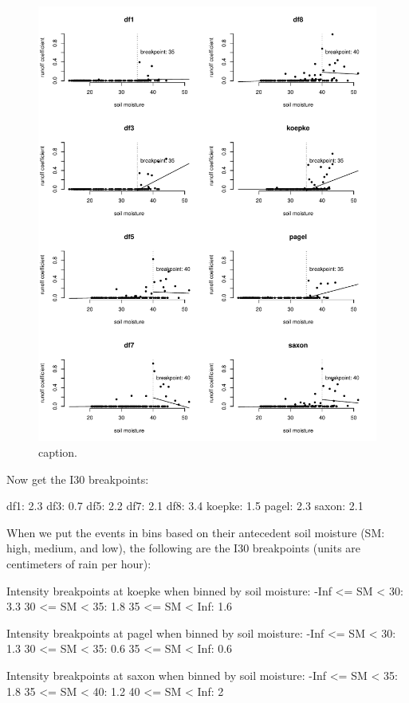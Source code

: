 \documentclass[12pt]{article}
\begin{document}
\begin{figure}
    \begin{center}
\includegraphics{runoff-sm}
    \end{center}
    \caption{caption.\label{sm}}
\end{figure}


Now get the I30 breakpoints:\\

\begin{Schunk}
\begin{Soutput}
df1: 2.3
df3: 0.7
df5: 2.2
df7: 2.1
df8: 3.4
koepke: 1.5
pagel: 2.3
saxon: 2.1
\end{Soutput}
\end{Schunk}


When we put the events in bins based on their antecedent soil moisture (SM: high, medium, and low), the following are the I30 breakpoints (units are centimeters of rain per hour):\\

\begin{Schunk}
\begin{Soutput}
Intensity breakpoints at koepke when binned by soil moisture:
-Inf <= SM < 30: 3.3
30 <= SM < 35: 1.8
35 <= SM < Inf: 1.6

Intensity breakpoints at pagel when binned by soil moisture:
-Inf <= SM < 30: 1.3
30 <= SM < 35: 0.6
35 <= SM < Inf: 0.6

Intensity breakpoints at saxon when binned by soil moisture:
-Inf <= SM < 35: 1.8
35 <= SM < 40: 1.2
40 <= SM < Inf: 2
\end{Soutput}
\end{Schunk}
\end{document}
